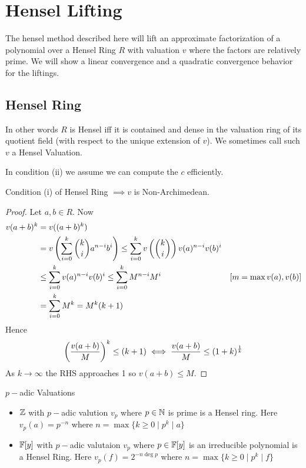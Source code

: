 \chapter{Hensel Lifting}
The hensel method described here will lift an approximate factorization of a polynomial over a Hensel Ring $R$ with valuation $v$ where the factors are relatively prime. We will show a linear convergence and a quadratic convergence behavior for the liftings.
\section{Hensel Ring}
In other words $R$ is Hensel iff it is contained and dense in the valuation ring of its quotient field (with respect to the unique extension of $v$). We sometimes call such $v$ a Hensel Valuation. 

In condition (ii) we assume we can compute the $c$ efficiently.
\begin{Theorem}{}{}
	Condition (i) of Hensel Ring $\implies v$ is Non-Archimedean.
\end{Theorem}
\begin{proof}
	Let $a,b\in R$. Now \begin{align*}
		v(a+b)^k & = v((a+b)^k)\\
		& = v\left(\sum_{i=0}^k{{k}\choose{i}}a^{n-i}b^i  \right)\leq \sum_{i=0}^kv\left(\binom{k}{i}\right)v(a)^{n-i}v(b)^i\\
		&\leq \sum_{i=0}^kv(a)^{n-i}v(b)^i\leq \sum_{i=0}^kM^{n-i}M^i &[m=\max{v(a),v(b)}]\\
		&=\sum_{i=0}^kM^k=M^k(k+1)
	\end{align*}Hence $$\left(\frac{v(a+b)}{M}\right)^k\leq (k+1)\iff \frac{v(a+b)}{M}\leq (1+k)^{\frac1k}$$As $k\to \infty$ the RHS approaches 1 so $v(a+b)\leq M$. 
\end{proof}

\begin{example}{$p-$adic Valuations}{}
	\begin{itemize}
		\item $\mathbb{Z}$ with $p-$adic valution $v_p$ where $p\in\mathbb{N}$ is prime is a Hensel ring. Here $v_p(a)=p^{-n}$ where $n=\max\{k\geq 0\mid p^k\mid a\}$
		\item $\mathbb{F}[y]$ with $p-$adic valutaion $v_p$ where $p\in \mathbb{F}[y]$ is an irreducible polynomial is a Hensel Ring. Here $v_p(f)=2^{-n\deg p}$ where $n=\max\{k\geq 0\mid p^k\mid f\}$
	\end{itemize}
\end{example}

